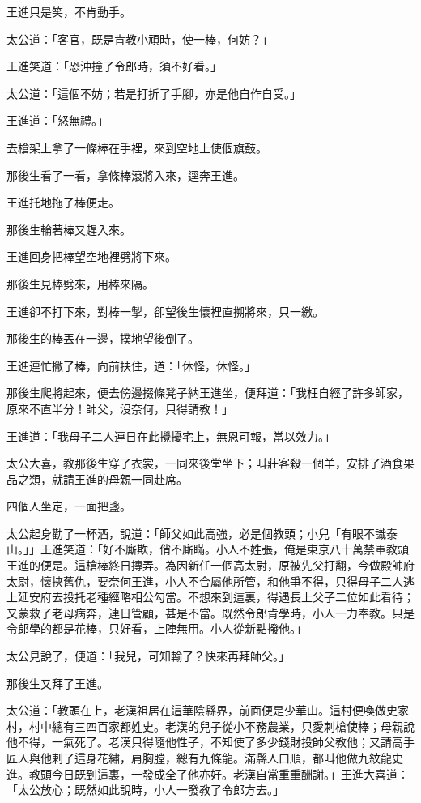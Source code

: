 \documentclass[11pt,a4paper]{article}
\begin{document}
王進只是笑，不肯動手。

太公道：「客官，既是肯教小頑時，使一棒，何妨？」

王進笑道：「恐沖撞了令郎時，須不好看。」

太公道：「這個不妨；若是打折了手腳，亦是他自作自受。」

王進道：「怒無禮。」

去槍架上拿了一條棒在手裡，來到空地上使個旗鼓。

那後生看了一看，拿條棒滾將入來，逕奔王進。

王進托地拖了棒便走。

那後生輪著棒又趕入來。

王進回身把棒望空地裡劈將下來。

那後生見棒劈來，用棒來隔。

王進卻不打下來，對棒一掣，卻望後生懷裡直搠將來，只一繳。

那後生的棒丟在一邊，撲地望後倒了。

王進連忙撇了棒，向前扶住，道：「休怪，休怪。」

那後生爬將起來，便去傍邊掇條凳子納王進坐，便拜道：「我枉自經了許多師家，原來不直半分！師父，沒奈何，只得請教！」

王進道：「我母子二人連日在此攪擾宅上，無恩可報，當以效力。」

太公大喜，教那後生穿了衣裳，一同來後堂坐下；叫莊客殺一個羊，安排了酒食果品之類，就請王進的母親一同赴席。

四個人坐定，一面把盞。

太公起身勸了一杯酒，說道：「師父如此高強，必是個教頭；小兒「有眼不識泰山。」」王進笑道：「好不廝欺，俏不廝瞞。小人不姓張，俺是東京八十萬禁軍教頭王進的便是。這槍棒終日摶弄。為因新任一個高太尉，原被先父打翻，今做殿帥府太尉，懷挾舊仇，要奈何王進，小人不合屬他所管，和他爭不得，只得母子二人逃上延安府去投托老種經略相公勾當。不想來到這裏，得遇長上父子二位如此看待；又蒙救了老母病奔，連日管顧，甚是不當。既然令郎肯學時，小人一力奉教。只是令郎學的都是花棒，只好看，上陣無用。小人從新點撥他。」

太公見說了，便道：「我兒，可知輸了？快來再拜師父。」

那後生又拜了王進。

太公道：「教頭在上，老漢祖居在這華陰縣界，前面便是少華山。這村便喚做史家村，村中總有三四百家都姓史。老漢的兒子從小不務農業，只愛刺槍使棒；母親說他不得，一氣死了。老漢只得隨他性子，不知使了多少錢財投師父教他；又請高手匠人與他剌了這身花繡，肩胸膛，總有九條龍。滿縣人口順，都叫他做九紋龍史進。教頭今日既到這裏，一發成全了他亦好。老漢自當重重酬謝。」王進大喜道：「太公放心；既然如此說時，小人一發教了令郎方去。」
\end{document}

